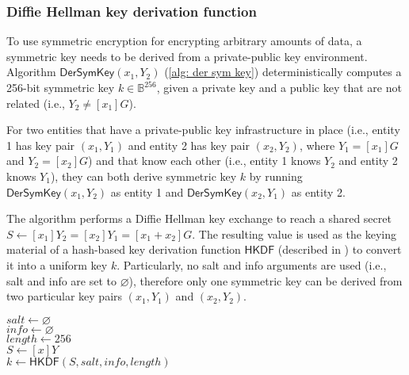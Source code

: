 \clearpage
\subsubsection{Diffie Hellman key derivation function} \label{app: diffie hellman key derivation function}
To use symmetric encryption for encrypting arbitrary amounts of data, a symmetric key needs to be derived from a private-public key environment. Algorithm $\mathsf{DerSymKey}(x_1, Y_2)$ (\cref{alg: der sym key}) deterministically computes a 256-bit symmetric key $k \in \mathbb{B}^{256}$, given a private key and a public key that are not related (i.e., $Y_2 \neq [x_1]G$).

For two entities that have a private-public key infrastructure in place (i.e., entity 1 has key pair $(x_1, Y_1)$ and entity 2 has key pair $(x_2, Y_2)$, where $Y_1 = [x_1]G$ and $Y_2 = [x_2]G$) and that know each other (i.e., entity 1 knows $Y_2$ and entity 2 knows $Y_1$), they can both derive symmetric key $k$ by running $\mathsf{DerSymKey}(x_1, Y_2)$ as entity 1 and $\mathsf{DerSymKey}(x_2, Y_1)$ as entity 2.

The algorithm performs a Diffie Hellman key exchange to reach a shared secret $S \gets [x_1]Y_2 = [x_2]Y_1 = [x_1 + x_2]G$. The resulting value is used as the keying material of a hash-based key derivation function $\mathsf{HKDF}$ (described in \cite{RFC5869}) to convert it into a uniform key $k$. Particularly, no salt and info arguments are used (i.e., salt and info are set to $\varnothing$), therefore only one symmetric key can be derived from two particular key pairs $(x_1, Y_1)$ and $(x_2, Y_2)$.

\begin{algorithm}[ht]
    \DontPrintSemicolon
    \caption{$\mathsf{DerSymKey}(x, Y)$}
    \label{alg: der sym key}
    
    $salt \gets \varnothing$ \\
    $info \gets \varnothing$ \\
    $length \gets 256$ \\
    $S \gets [x]Y$ \\
    $k \gets \mathsf{HKDF}(S, salt, info, length)$ \\
     
\end{algorithm}
